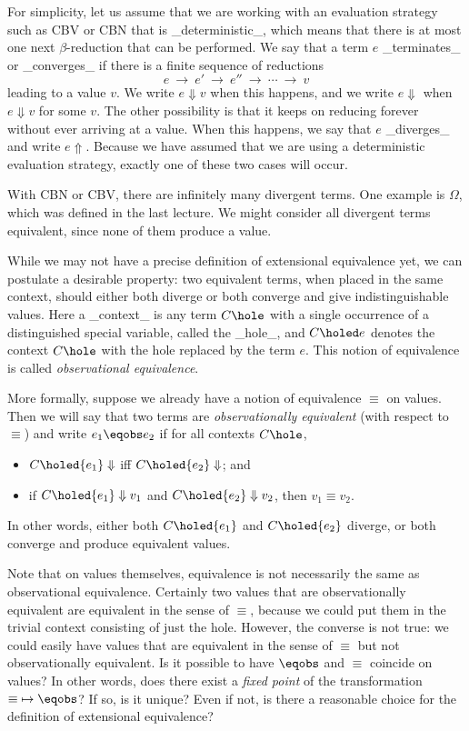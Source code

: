 For simplicity, let us assume that we are working with an evaluation
strategy such as CBV or CBN that is _deterministic_, which means that
there is at most one next $\beta$-reduction that can be performed. We
say that a term $e$ _terminates_ or _converges_ if there is a finite
sequence of reductions
\[
e\ \to\ e'\ \to\ e''\ \to\ \cdots\ \to\ v
\]
leading to a value $v$. We write $e\Downarrow v$ when this happens,
and we write $e\Downarrow$ when $e\Downarrow v$ for some $v$. The
other possibility is that it keeps on reducing forever without ever
arriving at a value. When this happens, we say that $e$ _diverges_ and
write $e \Uparrow$. Because we have assumed that we are using a
deterministic evaluation strategy, exactly one of these two cases will
occur.

With CBN or CBV, there are infinitely many divergent terms. One
example is $\Omega$, which was defined in the last lecture.  We might
consider all divergent terms equivalent, since none of them produce a
value.

While we may not have a precise definition of extensional equivalence
yet, we can postulate a desirable property: two equivalent terms, when
placed in the same context, should either both diverge or both
converge and give indistinguishable values. Here a _context_ is any
term $C\hole$ with a single occurrence of a distinguished special
variable, called the _hole_, and $C\holed e$ denotes the context
$C\hole$ with the hole replaced by the term $e$. This notion of
equivalence is called \emph{observational equivalence}.

More formally, suppose we already have a notion of equivalence
$\equiv$ on values.  Then we will say that two terms
are \emph{observationally equivalent} (with respect to $\equiv$) and
write $e_1\eqobs e_2$ if for all contexts $C\hole$,
\begin{itemize}
\item
$C\holed{e_1} \Downarrow$ iff $C\holed{e_2} \Downarrow$; and
\item
if $C\holed{e_1} \Downarrow v_1$ and $C\holed{e_2} \Downarrow v_2$, then $v_1\equiv v_2$.
\end{itemize}
In other words, either both $C\holed{e_1}$ and $C\holed{e_2}$ diverge,
or both converge and produce equivalent values.

Note that on values themselves, equivalence is not necessarily the
same as observational equivalence. Certainly two values that are
observationally equivalent are equivalent in the sense of $\equiv$,
because we could put them in the trivial context consisting of just
the hole. However, the converse is not true: we could easily have
values that are equivalent in the sense of $\equiv$ but not
observationally equivalent. Is it possible to have $\eqobs$ and
$\equiv$ coincide on values? In other words, does there exist
a \emph{fixed point} of the transformation ${\equiv}\mapsto{\eqobs}$? If
so, is it unique? Even if not, is there a reasonable choice for the
definition of extensional equivalence?

